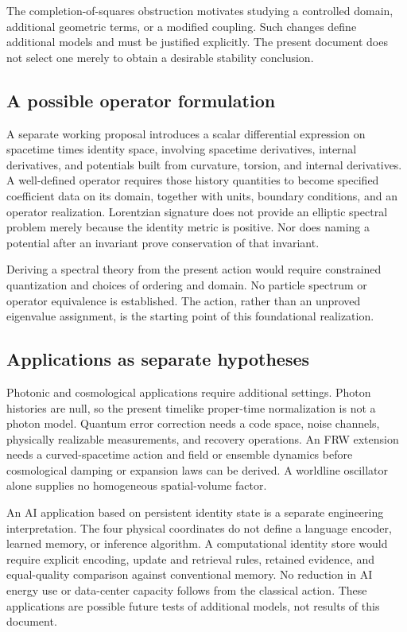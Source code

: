 \documentclass[11pt]{article}
\begin{document}
The completion-of-squares obstruction motivates studying a controlled domain, additional geometric terms, or a modified coupling. Such changes define additional models and must be justified explicitly. The present document does not select one merely to obtain a desirable stability conclusion.

\subsection{A possible operator formulation}
A separate working proposal introduces a scalar differential expression on spacetime times identity space, involving spacetime derivatives, internal derivatives, and potentials built from curvature, torsion, and internal derivatives.\cite{unified} A well-defined operator requires those history quantities to become specified coefficient data on its domain, together with units, boundary conditions, and an operator realization. Lorentzian signature does not provide an elliptic spectral problem merely because the identity metric is positive. Nor does naming a potential after an invariant prove conservation of that invariant.

Deriving a spectral theory from the present action would require constrained quantization and choices of ordering and domain. No particle spectrum or operator equivalence is established. The action, rather than an unproved eigenvalue assignment, is the starting point of this foundational realization.

\subsection{Applications as separate hypotheses}
Photonic and cosmological applications require additional settings. Photon histories are null, so the present timelike proper-time normalization is not a photon model. Quantum error correction needs a code space, noise channels, physically realizable measurements, and recovery operations. An FRW extension needs a curved-spacetime action and field or ensemble dynamics before cosmological damping or expansion laws can be derived. A worldline oscillator alone supplies no homogeneous spatial-volume factor.

An AI application based on persistent identity state is a separate engineering interpretation. The four physical coordinates do not define a language encoder, learned memory, or inference algorithm. A computational identity store would require explicit encoding, update and retrieval rules, retained evidence, and equal-quality comparison against conventional memory. No reduction in AI energy use or data-center capacity follows from the classical action. These applications are possible future tests of additional models, not results of this document.
\end{document}
